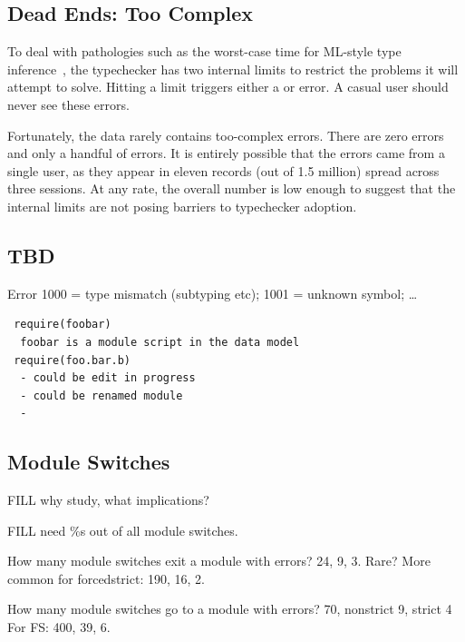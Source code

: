 \documentclass[english,submission,cleveref]{programming}
\begin{document}
\subsection{Dead Ends: Too Complex}

To deal with pathologies such as the worst-case time for ML-style type
inference~\cite{m-popl-1990,ktu-caap-1990}, the typechecker
has two internal limits to restrict the problems it will attempt to solve.
Hitting a limit triggers either a  or
 error.
A casual user should never see these errors.

Fortunately, the data rarely contains too-complex errors.
There are zero  errors and only a
handful of  errors.
It is entirely possible that the  errors came from
a single user, as they appear in eleven records (out of 1.5 million)
spread across three sessions.
At any rate, the overall number is low enough to suggest that the internal
limits are not posing barriers to typechecker adoption.


\subsection{TBD}

Error 1000 = type mismatch (subtyping etc);
1001 = unknown symbol;
\ldots



\begin{verbatim}
 require(foobar)
  foobar is a module script in the data model
 require(foo.bar.b)
  - could be edit in progress
  - could be renamed module
  - 
\end{verbatim}


\subsection{Module Switches}

FILL why study, what implications?

FILL need \%s out of all module switches.

How many module switches exit a module with errors?
\mnocheck{} 24, \mnonstrict{} 9, \mstrict{} 3.
Rare?
More common for forcedstrict:
 \mnocheck{} 190, \mnonstrict{} 16, \mstrict{} 2.

How many module switches go to a module with errors?
\mnocheck{} 70, nonstrict 9, strict 4
For FS: \mnocheck{} 400, \mnonstrict{} 39, \mstrict{} 6.
\end{document}
